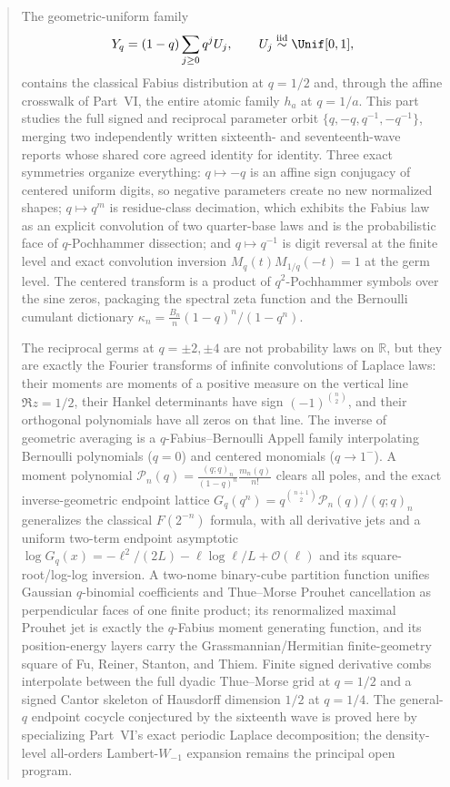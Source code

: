 \documentclass[11pt,oneside]{article}
\numberwithin{equation}{section}
\theoremstyle{definition}
\theoremstyle{remark}
\newcommand{\R}{\mathbb R}
\newcommand{\bigO}{\mathcal O}
\begin{document}
\begin{abstract}
The geometric-uniform family
\[
 Y_q=(1-q)\sum_{j\ge0}q^jU_j,
 \qquad U_j\stackrel{\mathrm{iid}}{\sim}\Unif[0,1],
\]
contains the classical Fabius distribution at $q=1/2$ and, through the affine
crosswalk of Part~VI, the entire atomic family $h_a$ at $q=1/a$.  This part
studies the full signed and reciprocal parameter orbit
$\{q,-q,q^{-1},-q^{-1}\}$, merging two independently written sixteenth- and
seventeenth-wave reports whose shared core agreed identity for identity.
Three exact symmetries organize everything: $q\mapsto-q$ is an affine sign
conjugacy of centered uniform digits, so negative parameters create no new
normalized shapes; $q\mapsto q^m$ is residue-class decimation, which exhibits
the Fabius law as an explicit convolution of two quarter-base laws and is the
probabilistic face of $q$-Pochhammer dissection; and $q\mapsto q^{-1}$ is digit
reversal at the finite level and exact convolution inversion
$M_q(t)M_{1/q}(-t)=1$ at the germ level.  The centered transform is a product
of $q^2$-Pochhammer symbols over the sine zeros, packaging the spectral zeta
function and the Bernoulli cumulant dictionary
$\kappa_n=\tfrac{B_n}{n}(1-q)^n/(1-q^n)$.

The reciprocal germs at $q=\pm2,\pm4$ are not probability laws on $\R$, but
they are exactly the Fourier transforms of infinite convolutions of Laplace
laws: their moments are moments of a positive measure on the vertical line
$\Re z=1/2$, their Hankel determinants have sign $(-1)^{\binom n2}$, and their
orthogonal polynomials have all zeros on that line.  The inverse of geometric
averaging is a $q$-Fabius--Bernoulli Appell family interpolating Bernoulli
polynomials ($q=0$) and centered monomials ($q\to1^-$).  A moment polynomial
$\mathcal P_n(q)=\tfrac{(q;q)_n}{(1-q)^n}\tfrac{m_n(q)}{n!}$ clears all poles,
and the exact inverse-geometric endpoint lattice
$G_q(q^n)=q^{\binom{n+1}2}\mathcal P_n(q)/(q;q)_n$ generalizes the classical
$F(2^{-n})$ formula, with all derivative jets and a uniform two-term
endpoint asymptotic
$\log G_q(x)=-\ell^2/(2L)-\ell\log\ell/L+\bigO(\ell)$ and its square-root/log-log
inversion.  A two-nome binary-cube partition function unifies Gaussian
$q$-binomial coefficients and Thue--Morse Prouhet cancellation as perpendicular
faces of one finite product; its renormalized maximal Prouhet jet is exactly
the $q$-Fabius moment generating function, and its position-energy layers
carry the Grassmannian/Hermitian finite-geometry square of Fu, Reiner,
Stanton, and Thiem.  Finite signed derivative combs interpolate between the
full dyadic Thue--Morse grid at $q=1/2$ and a signed Cantor skeleton of
Hausdorff dimension $1/2$ at $q=1/4$.  The general-$q$ endpoint cocycle
conjectured by the sixteenth wave is proved here by specializing Part~VI's
exact periodic Laplace decomposition; the density-level all-orders
Lambert-$W_{-1}$ expansion remains the principal open program.
\end{abstract}
\end{document}
